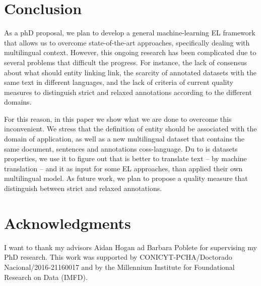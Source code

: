\documentclass[sigconf]{acmart}
\begin{document}
\section{Conclusion}

As a phD proposal, we plan to develop a general machine-learning EL framework that allows us to overcome state-of-the-art approaches, specifically dealing with multilingual context. However, this ongoing research has been complicated due to several problems that difficult the progress. For instance, the lack of consensus about what should entity linking link, the scarcity of annotated datasets with the same text in different languages, and the lack of criteria of current quality measures to distinguish strict and relaxed annotations according to the different domains. 

For this reason, in this paper we show what we are done to overcome this inconvenient. We stress that the definition of entity should be associated with the domain of application, as well as a new multilingual dataset that contains the same document, sentences and annotations coss-language. Du to is datasets properties, we use it to figure out that is better to translate text -- by machine translation -- and it as input for some EL approaches, than applied their own multilingual model. As future work, we plan to propose a quality measure that distinguish between strict and relaxed annotations. 

\section{Acknowledgments}
I want to thank my advisors Aidan Hogan ad Barbara Poblete for supervising my PhD research. This work was supported by CONICYT-PCHA/Doctorado Nacional/2016-21160017 and by the Millennium Institute for Foundational Research on Data (IMFD).

%


\end{document}
